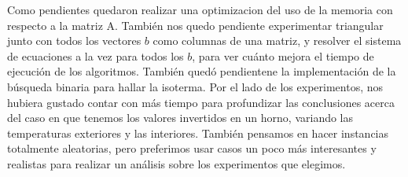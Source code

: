 Como pendientes quedaron realizar una optimizacion del uso de la memoria con respecto a la matriz A. También nos quedo pendiente experimentar triangular junto con todos los vectores $b$ como columnas de una matriz, y resolver el sistema de ecuaciones a la vez para todos los $b$, para ver cuánto mejora el tiempo de ejecución de los algoritmos. También quedó pendientene la implementación de la búsqueda binaria para hallar la isoterma. Por el lado de los experimentos, nos hubiera gustado contar con más tiempo para profundizar las conclusiones acerca del caso en que tenemos los valores invertidos en un horno, variando las temperaturas exteriores y las interiores. También pensamos en hacer instancias totalmente aleatorias, pero preferimos usar casos un poco más interesantes y realistas para realizar un análisis sobre los experimentos que elegimos.  
